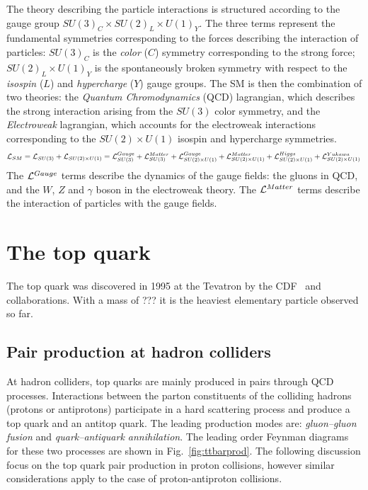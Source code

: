 The theory describing the particle interactions is structured
according to the gauge group $SU(3)_C\times{}SU(2)_L\times{}U(1)_Y$. The three
terms represent the fundamental symmetries corresponding to the forces describing the
interaction of particles: $SU(3)_C$ is the {\it color} ($C$) symmetry corresponding
to the strong force; $SU(2)_L\times{}U(1)_Y$ is the spontaneously
broken symmetry with respect to the {\it isospin} ($L$)
and {\it hypercharge} ($Y$) gauge groups.
The SM is then the combination of two theories: the {\it Quantum
  Chromodynamics} (QCD) lagrangian, which describes the strong
interaction arising from the $SU(3)$ color symmetry, and the {\it
  Electroweak} lagrangian, which accounts for the electroweak
interactions corresponding to the $SU(2)\times{}U(1)$ isospin and
hypercharge symmetries.
\begin{equation}
\mathcal{L}{}_{SM} = \mathcal{L}{}_{SU(3)} + \mathcal{L}{}_{SU(2)\times{}U(1)}
= \mathcal{L}{}_{SU(3)}^{Gauge} + \mathcal{L}{}_{SU(3)}^{Matter} 
+ \mathcal{L}{}_{SU(2)\times{}U(1)}^{Gauge} + \mathcal{L}{}_{SU(2)\times{}U(1)}^{Matter}
+ \mathcal{L}{}_{SU(2)\times{}U(1)}^{Higgs} +
\mathcal{L}{}_{SU(2)\times{}U(1)}^{Yukawa}
\phantom{.}
\end{equation}
The $\mathcal{L}{}^{Gauge}$ terms describe the dynamics of the gauge fields:
the gluons in QCD, and the $W$, $Z$ and $\gamma$ boson in the
electroweak theory. The $\mathcal{L}{}^{Matter}$ terms describe the
interaction of particles with the gauge fields.

\section{The top quark}
\label{sec:topquark}

The top quark was discovered in 1995 at the Tevatron by the
CDF~\cite{topcdf} and \dzero{}~\cite{topd0} collaborations. With a
mass of ???\cite{topmass} it is the heaviest elementary particle
observed so far.

\subsection{Pair production at hadron colliders}
\label{sec:topprod}

At hadron colliders, top quarks are mainly produced in pairs through QCD
processes. Interactions between the parton constituents of the
colliding hadrons (protons or antiprotons) participate in a hard
scattering process and produce a top quark and an antitop quark. The
leading production modes are: {\it gluon--gluon fusion} and {\it
  quark--antiquark annihilation}. The leading order Feynman diagrams
for these two processes are shown in Fig.~\ref{fig:ttbarprod}. The
following discussion focus on the top quark pair production in proton
collisions, however similar considerations apply to the case of
proton-antiproton collisions.

